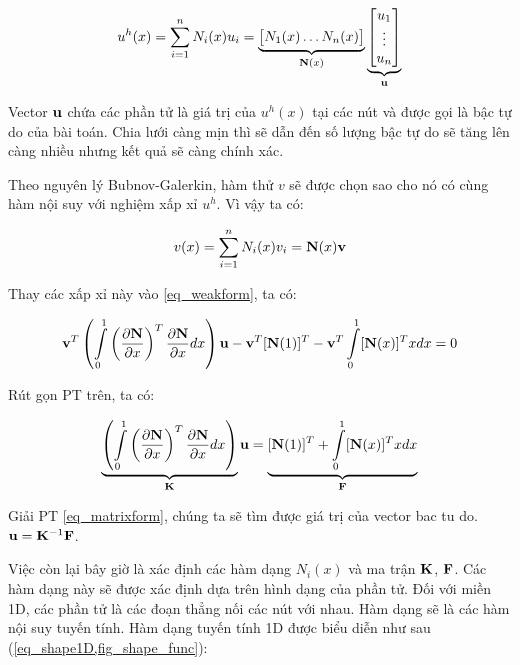 \begin{equation}\label{eq_interpolation}
    u^h(x) = \sum\limits_{i=1}^n N_i(x) u_i = \underbrace{\begin{bmatrix}
        N_1(x) \dots N_n(x)
    \end{bmatrix}}_{{\bf N}(x)} \underbrace{\begin{bmatrix}
        u_1 \\ \vdots \\ u_n 
    \end{bmatrix}}_{\bf u}
\end{equation}

Vector ${\bf u}$ chứa các phần tử là giá trị của $u^h(x)$ tại các nút và được gọi là bậc tự do của bài toán. Chia lưới càng mịn thì sẽ dẫn đến số lượng bậc tự do sẽ tăng lên càng nhiều nhưng kết quả sẽ càng chính xác.

Theo nguyên lý Bubnov-Galerkin, hàm thử $v$ sẽ được chọn sao cho nó có cùng hàm nội suy với nghiệm xấp xỉ $u^h$. Vì vậy ta có:

\begin{equation}\label{eq_interpolation_test}
    v(x) = \sum\limits_{i=1}^n N_i(x) v_i = {{\bf N}(x)}{\bf v}
\end{equation}

Thay các xấp xỉ này vào \cref{eq_weakform}, ta có:

\begin{equation}
    {\bf v}^T\left(\int\limits_0^1\left(\frac{\partial{\bf N}}{\partial x}\right)^T\frac{\partial{\bf N}}{\partial x} dx\right){\bf u} - {\bf v}^T[{\bf N}(1)]^T - {\bf v}^T\int\limits_0^1 [{\bf N}(x)]^Tx dx = 0
\end{equation}

Rút gọn PT trên, ta có:

\begin{equation}\label{eq_matrixform}
    \underbrace{\left(\int\limits_0^1\left(\frac{\partial{\bf N}}{\partial x}\right)^T\frac{\partial{\bf N}}{\partial x} dx\right)}_{\bf K}{\bf u} = \underbrace{[{\bf N}(1)]^T + \int\limits_0^1 [{\bf N}(x)]^Tx dx}_{\bf F} 
\end{equation}

Giải PT \cref{eq_matrixform}, chúng ta sẽ tìm được giá trị của vector bac tu do. ${\bf u} = {\bf K}^{-1}{\bf F}$.

Việc còn lại bây giờ là xác định các hàm dạng $N_i(x)$ và ma trận ${\bf K}$, ${\bf F}$. Các hàm dạng này sẽ được xác định dựa trên hình dạng của phần tử. Đối với miền 1D, các phần tử là các đoạn thẳng nối các nút với nhau. Hàm dạng sẽ là các hàm nội suy tuyến tính. Hàm dạng tuyến tính 1D được biểu diễn như sau (\cref{eq_shape1D,fig_shape_func}):

